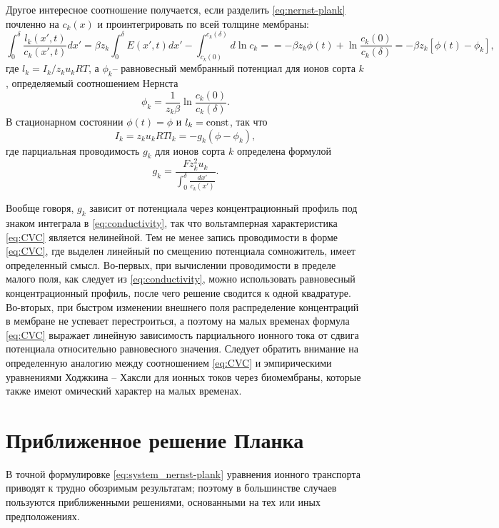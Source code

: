 Другое интересное соотношение получается, если разделить \eqref{eq:nernst-plank}
почленно на \( c_k(x) \) и проинтегрировать по всей толщине мембраны:
\[
    \int_0^\delta \frac{l_k(x', t)}{c_k(x', t)} dx' =
    \beta z_k \int_0^\delta E(x', t) dx' - \int_{c_k(0)}^{c_k(\delta)} d\ln c_k=
    = -\beta z_k \phi(t) + \ln\frac{c_k(0)}{c_k(\delta)} =
    -\beta z_k[\phi(t) - \phi_k],
\]
где \( l_k = I_k / z_k u_k RT \), а \( \phi_k \)-- равновесный мембранный
потенциал для ионов сорта \( k \), определяемый соотношением Нернста
\[
    \phi_k = \frac{1}{z_k\beta}\ln\frac{c_k(0)}{c_k(\delta)}.
\]
В стационарном состоянии \( \phi(t) = \phi \) и \( l_k = \mathrm{const} \), так что
\begin{equation}
    I_k = z_k u_k RT l_k = -g_k(\phi - \phi_k),
    \label{eq:CVC}
\end{equation}
где парциальная проводимость \( g_k \) для ионов сорта \( k \) определена
формулой
\begin{equation}
    g_k = \frac{F z_k^2 u_k}{\int_0^\delta\frac{dx'}{c_k(x')}}.
    \label{eq:conductivity}
\end{equation}

Вообще говоря, \( g_k \) зависит от потенциала через концентрационный профиль
под знаком интеграла в \eqref{eq:conductivity}, так что вольтамперная
характеристика \eqref{eq:CVC} является нелинейной. Тем не менее запись
проводимости в форме \eqref{eq:CVC}, где выделен линейный по смещению потенциала
сомножитель, имеет определенный смысл. Во-первых, при вычислении проводимости в
пределе малого поля, как следует из \eqref{eq:conductivity}, можно использовать
равновесный концентрационный профиль, после чего решение сводится к одной
квадратуре. Во-вторых, при быстром изменении внешнего поля распределение
концентраций в мембране не успевает перестроиться, а поэтому на малых временах
формула \eqref{eq:CVC} выражает линейную зависимость парциального ионного тока
от сдвига потенциала относительно равновесного значения. Следует обратить
внимание на определенную аналогию между соотношением \eqref{eq:CVC} и
эмпирическими уравнениями Ходжкина -- Хаксли для ионных токов через биомембраны,
которые также имеют омический характер на малых временах.

\section{Приближенное решение Планка}
В точной формулировке \eqref{eq:system_nernst-plank} уравнения ионного
транспорта приводят к трудно обозримым результатам; поэтому в большинстве
случаев пользуются приближенными решениями, основанными на тех или иных
предположениях.

